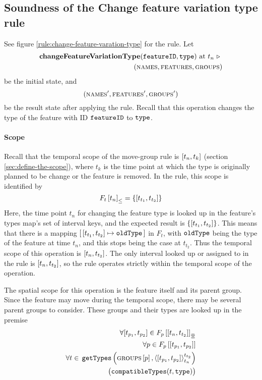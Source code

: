 
\subsection{Soundness of the Change feature variation type rule} 
\label{sub:soundness-of-the-change-feature-variation-type-rule}

See figure \vref{rule:change-feature-varation-type} for the  rule. Let 
\begin{equation*}
   \begin{split}
      \textbf{changeFeatureVariationType}(\texttt{featureID}, \texttt{type}) \text{ at } t_n \ \triangleright \  \\
      (\textsc{names}, \textsc{features}, \textsc{groups}{})
   \end{split}
\end{equation*}
be the initial state, and
\[
   (\textsc{names}', \textsc{features}', \textsc{groups}{}')
\]
be the result state after applying the  rule. Recall that this operation changes the type of the feature with ID $\texttt{featureID}$ to $\texttt{type}$.

\paragraph{Scope}
Recall that the temporal scope of the move-group rule is $\interval{t_n}{t_k}$ (section \vref{sec:define-the-scope}), where $t_k$ is the time point at which the type is originally planned to be change or the feature is removed. In the rule, this scope is identified by 
   \[
      \containing{F_t}{t_n} = \set{\interval{t_{t_1}}{t_{t_2}}}
   \]
   Here, the time point $t_n$ for changing the feature type is looked up in the feature's types map's set of interval keys, and the expected result is $\set{\interval{t_{t_1}}{t_{t_2}}}$. This means that there is a mapping $\intervalmapping{t_{t_1}}{t_{t_2}}{\var{oldType}}$ in $F_t$, with $\texttt{oldType}$ being the type of the feature at time $t_n$, and this stops being the case at $t_{t_2}$. Thus the temporal scope of this operation is $\interval{t_n}{t_{t_2}}$. The only interval looked up or assigned to in the rule is $\interval{t_n}{t_{t_2}}$, so the rule operates strictly within the temporal scope of the operation.

   The spatial scope for this operation is the feature itself and its parent group. Since the feature may move during the temporal scope, there may be several parent groups to consider. These groups and their types are looked up in the premise
\[
   \begin{split}
      \forall \interval{t_{p_1}}{t_{p_2}} \in \overlapping{F_p}{t_n}{t_{t_2}}  \\ %
      \forall p \in \lookup{F_p}{\interval{t_{p_1}}{t_{p_2}}}  \\%
      \forall t \in \, \var{getTypes}\left(\lookup{\groups}{p}, \clamp{\interval{t_{p_1}}{t_{p_2}}}{t_n}{t_{t_2}}\right)  \\
          \big(\var{compatibleTypes}(t, \var{type})\big) 
    \end{split}
\]

